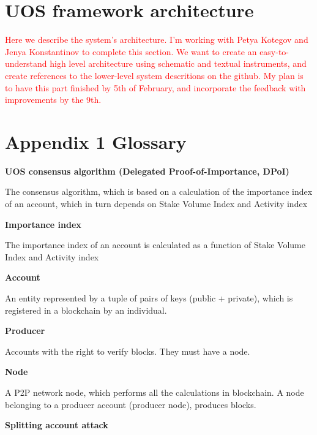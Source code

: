 \documentclass[a4paper,12pt]{article}
\begin{document}
\section{U{\degree}OS framework architecture}
\textcolor{red}{Here we describe the system's architecture. I'm working with Petya Kotegov and Jenya Konstantinov to complete this section. We want to create an easy-to-understand high level architecture using schematic and textual instruments, and create references to the lower-level system descritions on the github. My plan is to have this part finished by 5th of February, and incorporate the feedback with improvements by the 9th.}



\section*{Appendix 1 Glossary}
\textbf{U{\degree}OS consensus algorithm (Delegated Proof-of-Importance, DPoI)}

The consensus algorithm, which is based on a calculation of the importance index of an account, which in turn depends on Stake Volume Index and Activity index

\textbf{Importance index}

The importance index of an account is calculated as a function of Stake Volume Index and Activity index

\textbf{Account}

An entity represented by a tuple of pairs of keys (public + private), which is registered in a blockchain by an individual.

\textbf{Producer}

Accounts with the right to verify blocks. They must have a node.

\textbf{Node}

A P2P network node, which performs all the calculations in blockchain. A node belonging to a producer account (producer node), produces blocks.

\textbf{Splitting account attack} 
\end{document}
